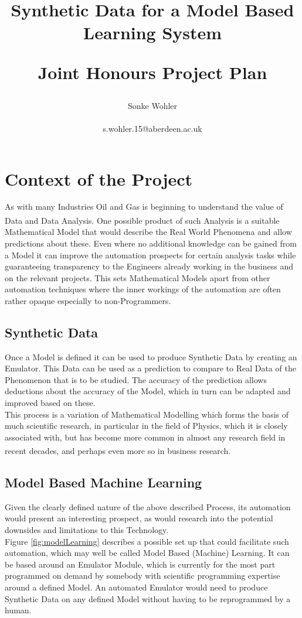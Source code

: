 \documentclass{article}
\title{
    Synthetic Data for a Model Based Learning System
\\
\begin{small}
    Joint Honours Project Plan
\end{small} 
}
\author{Sonke Wohler \\
\begin{small}
    s.wohler.15@aberdeen.ac.uk
\end{small}
}
\date{\begin{small}
    Department of Computing Science/ Department of Physics
    \\
    University of Aberdeen
\end{small}}
\begin{document}
\maketitle
\thispagestyle{empty}

\section{Context of the Project}


As with many Industries Oil and Gas is beginning to understand the value of Data and Data Analysis. \textsuperscript{\cite{chickenEgg,cloudOil}}
One possible product of such Analysis is a suitable Mathematical Model that would describe the Real World Phenomena and allow predictions about these.
Even where no additional knowledge can be gained from a Model it can improve the automation prospects for certain analysis tasks while guaranteeing transparency to the Engineers already working in the business and on the relevant projects. This sets Mathematical Models apart from other automation techniques where the inner workings of the automation are often rather opaque especially to non-Programmers. 

  \subsection{Synthetic Data}
  
Once a Model is defined it can be used to produce Synthetic Data by creating an Emulator. This Data can be used as a prediction to compare to Real Data of the Phenomenon that is to be studied. The accuracy of the prediction allows deductions about the accuracy of the Model, which in turn can be adapted and improved based on these.
\\ This process is a variation of Mathematical Modelling which forms the basis of much scientific research, in particular in the field of Physics, which it is closely associated with, but has become more common in almost any research field in recent decades, and perhaps even more so in business research.   \textsuperscript{\cite{modelling}}


  
  \subsection{Model Based Machine Learning}
  
Given the clearly defined nature of the above described Process, its automation would present an interesting prospect, as would research into the potential downsides and limitations to this Technology.
\\ Figure \ref{fig:modelLearning} describes a possible set up that could facilitate such automation, which may well be called Model Based (Machine) Learning. It can be based around an Emulator Module, which is currently for the most part programmed on demand by somebody with scientific programming expertise around a defined Model. An automated Emulator would need to produce Synthetic Data on any defined Model without having to be reprogrammed by a human.
\end{document}
